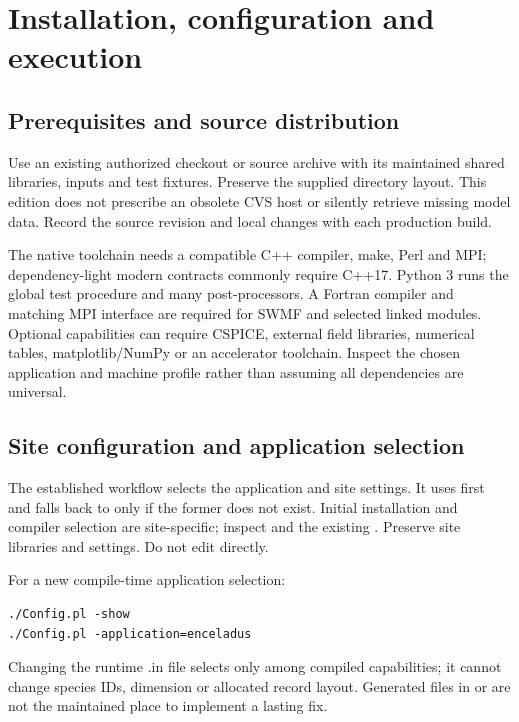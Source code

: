 \chapter{Installation, configuration and execution}\label{ch:installation}
\section{Prerequisites and source distribution}
Use an existing authorized checkout or source archive with its maintained
shared libraries, inputs and test fixtures. Preserve the supplied directory
layout. This edition does not prescribe an obsolete CVS host or silently
retrieve missing model data. Record the source revision and local changes
with each production build.

The native toolchain needs a compatible C++ compiler, make, Perl and MPI;
dependency-light modern contracts commonly require C++17. Python 3 runs the
global test procedure and many post-processors. A Fortran compiler and matching
MPI interface are required for SWMF and selected linked modules. Optional
capabilities can require CSPICE, external field libraries, numerical tables,
matplotlib/NumPy or an accelerator toolchain. Inspect the chosen application
and machine profile rather than assuming all dependencies are universal.

\section{Site configuration and application selection}
The established  workflow selects the application and site
settings. It uses  first and falls back to
 only if the former does not exist. Initial installation
and compiler selection are site-specific; inspect 
and the existing . Preserve site libraries and settings.
Do not edit  directly.

For a new compile-time application selection:
\begin{lstlisting}
./Config.pl -show
./Config.pl -application=enceladus
\end{lstlisting}
Changing the runtime .in file selects only among compiled capabilities; it
cannot change species IDs, dimension or allocated record layout.
Generated files in  or  are not the maintained
place to implement a lasting fix.

